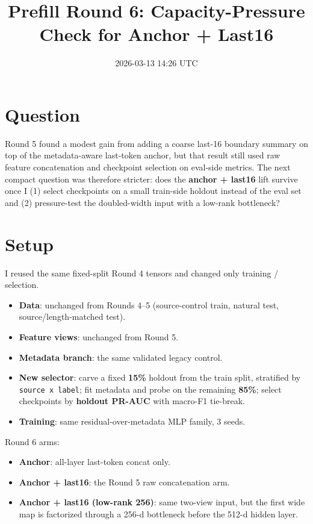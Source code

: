 \documentclass[11pt]{article}
\title{Prefill Round 6: Capacity-Pressure Check for Anchor + Last16}
\author{}
\date{2026-03-13 14:26 UTC}
\begin{document}
\maketitle

\section*{Question}
Round 5 found a modest gain from adding a coarse last-16 boundary summary on top of the metadata-aware last-token anchor, but that result still used raw feature concatenation and checkpoint selection on eval-side metrics. The next compact question was therefore stricter: does the \textbf{anchor + last16} lift survive once I (1) select checkpoints on a small train-side holdout instead of the eval set and (2) pressure-test the doubled-width input with a low-rank bottleneck?

\section*{Setup}
I reused the same fixed-split Round 4 tensors and changed only training / selection.

\begin{itemize}
  \item \textbf{Data}: unchanged from Rounds 4--5 (source-control train, natural test, source/length-matched test).
  \item \textbf{Feature views}: unchanged from Round 5.
  \item \textbf{Metadata branch}: the same validated legacy control.
  \item \textbf{New selector}: carve a fixed \textbf{15\%} holdout from the train split, stratified by \texttt{source x label}; fit metadata and probe on the remaining \textbf{85\%}; select checkpoints by \textbf{holdout PR-AUC} with macro-F1 tie-break.
  \item \textbf{Training}: same residual-over-metadata MLP family, 3 seeds.
\end{itemize}

Round 6 arms:
\begin{itemize}
  \item \textbf{Anchor}: all-layer last-token concat only.
  \item \textbf{Anchor + last16}: the Round 5 raw concatenation arm.
  \item \textbf{Anchor + last16 (low-rank 256)}: same two-view input, but the first wide map is factorized through a 256-d bottleneck before the 512-d hidden layer.
\end{itemize}
\end{document}
